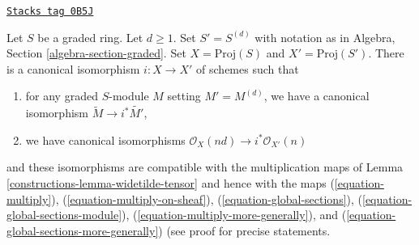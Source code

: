 \begin{lemma}[D uple]
\label{constructions-lemma-d-uple}
\href{https://stacks.math.columbia.edu/tag/0B5J}{\texttt{Stacks tag 0B5J}}

Let $S$ be a graded ring. Let $d \geq 1$. Set $S' = S^{(d)}$ with notation
as in Algebra, Section \ref{algebra-section-graded}. Set
$X = \text{Proj}(S)$ and $X' = \text{Proj}(S')$. There is a canonical
isomorphism $i : X \to X'$ of schemes such that
\begin{enumerate}
\item for any graded $S$-module $M$ setting $M' = M^{(d)}$,
we have a canonical isomorphism $\widetilde{M} \to i^*\widetilde{M'}$,
\item we have canonical isomorphisms
$\mathcal{O}_{X}(nd) \to i^*\mathcal{O}_{X'}(n)$
\end{enumerate}
and these isomorphisms are compatible with the multiplication maps
of Lemma \ref{constructions-lemma-widetilde-tensor} and hence with the maps
(\ref{equation-multiply}),
(\ref{equation-multiply-on-sheaf}),
(\ref{equation-global-sections}),
(\ref{equation-global-sections-module}),
(\ref{equation-multiply-more-generally}), and
(\ref{equation-global-sections-more-generally}) (see proof for precise
statements.
\end{lemma}

